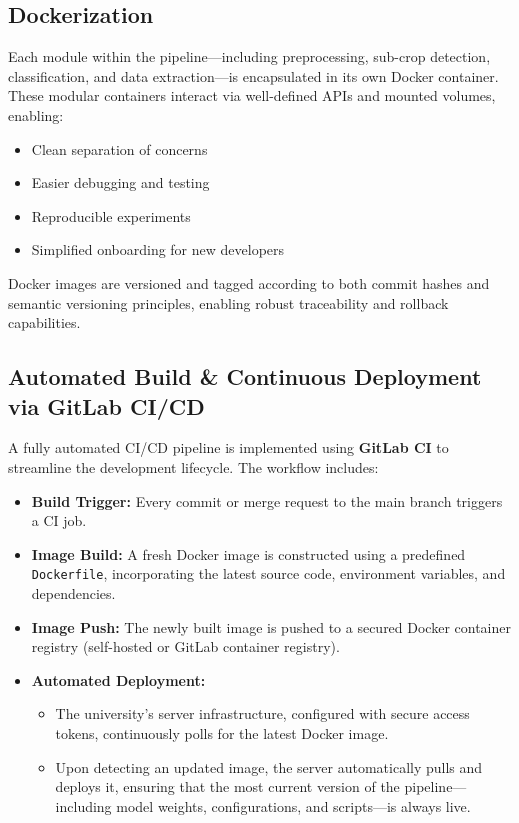 \documentclass[11pt,a4paper]{article}
\begin{document}
\subsection{Dockerization}

Each module within the pipeline—including preprocessing, sub-crop detection, classification, and data extraction—is encapsulated in its own Docker container. These modular containers interact via well-defined APIs and mounted volumes, enabling:

\begin{itemize}
    \item Clean separation of concerns
    \item Easier debugging and testing
    \item Reproducible experiments
    \item Simplified onboarding for new developers
\end{itemize}

Docker images are versioned and tagged according to both commit hashes and semantic versioning principles, enabling robust traceability and rollback capabilities.

\subsection{Automated Build \& Continuous Deployment via GitLab CI/CD}

A fully automated CI/CD pipeline is implemented using \textbf{GitLab CI} to streamline the development lifecycle. The workflow includes:

\begin{itemize}
    \item \textbf{Build Trigger:} Every commit or merge request to the main branch triggers a CI job.
    \item \textbf{Image Build:} A fresh Docker image is constructed using a predefined \texttt{Dockerfile}, incorporating the latest source code, environment variables, and dependencies.
    \item \textbf{Image Push:} The newly built image is pushed to a secured Docker container registry (self-hosted or GitLab container registry).
    \item \textbf{Automated Deployment:}
    \begin{itemize}
        \item The university’s server infrastructure, configured with secure access tokens, continuously polls for the latest Docker image.
        \item Upon detecting an updated image, the server automatically pulls and deploys it, ensuring that the most current version of the pipeline—including model weights, configurations, and scripts—is always live.
    \end{itemize}
\end{itemize}
\end{document}
